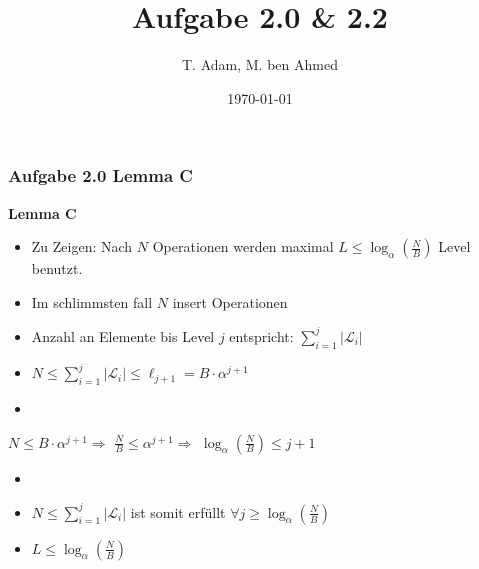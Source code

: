 \documentclass[aspectratio=169]{beamer}
\title[Aufgabe 1.1]{Aufgabe 2.0 \& 2.2} %
\author{T. Adam, M. ben Ahmed} %
\institute[UOS] %
{

Universität Osnabrück \\ %

\medskip
\textit{Æ} %


}
\date{\today} %
\begin{document}
\begin{frame}
\titlepage %
\end{frame}





\begin{frame}
	\frametitle{Aufgabe 2.0 Lemma C}
	
	\textbf{Lemma C}
	\begin{itemize}
		\item Zu Zeigen: Nach $N$ Operationen werden maximal $L \leq \log_{\alpha}(\frac{N}{B})$ Level benutzt.
		\item Im schlimmsten fall $N$ insert Operationen
		\item Anzahl an Elemente bis Level $j$ entspricht: $ \sum_{i = 1}^{j} |\mathcal{L}_i|$
		\item $N \leq \sum_{i = 1}^{j} |\mathcal{L}_i| \leq \ell_{j+1} = B \cdot \alpha^{j+1}$
		\item[]
	\end{itemize}

		\quad $N \leq B \cdot \alpha^{j+1} \Rightarrow$ 
		$\frac{N}{B} \leq \alpha^{j+1} \Rightarrow$
		$\log_{\alpha}(\frac{N}{B}) \leq j + 1$ 
		
	\begin{itemize}
		\item[]
		\item $N \leq \sum_{i = 1}^{j} |\mathcal{L}_i|$ ist somit erfüllt $\forall j \geq \log_{\alpha}(\frac{N}{B})$
		\item $L \leq \log_{\alpha}(\frac{N}{B})$
	\end{itemize}
		
	
	\end{frame}
\end{document}
